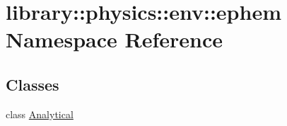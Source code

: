 \hypertarget{namespacelibrary_1_1physics_1_1env_1_1ephem}{}\section{library\+:\+:physics\+:\+:env\+:\+:ephem Namespace Reference}
\label{namespacelibrary_1_1physics_1_1env_1_1ephem}
\subsection*{Classes}
\begin{DoxyCompactItemize}
\item 
class \hyperlink{classlibrary_1_1physics_1_1env_1_1ephem_1_1_analytical}{Analytical}
\end{DoxyCompactItemize}
